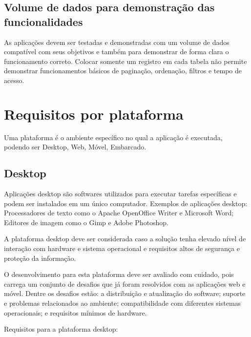


\subsection{Volume de dados para demonstração das funcionalidades}
As aplicações devem ser testadas e demonstradas com um volume de dados compatível com seus objetivos e também para demonstrar de forma clara o funcionamento correto. Colocar somente um registro em cada tabela não permite demonstrar funcionamentos básicos de paginação, ordenação, filtros e tempo de acesso.



\section{Requisitos por plataforma}
Uma plataforma é o ambiente específico no qual a aplicação é executada, podendo ser Desktop, Web, Móvel, Embarcado. 



\subsection{Desktop}
Aplicações desktop são softwares utilizados para executar tarefas específicas e podem ser instalados em um único computador. Exemplos de aplicações desktop: Processadores de texto como o Apache OpenOffice Writer e Microsoft Word; Editores de imagem como o Gimp e Adobe Photoshop.

A plataforma desktop deve ser considerada caso a solução tenha elevado nível de interação com hardware e sistema operacional e requisitos altos de segurança e proteção da informação. 

O desenvolvimento para esta plataforma deve ser avaliado com cuidado, pois carrega um conjunto de desafios que já foram resolvidos com as aplicações web e móvel. Dentre os desafios estão: a distribuição e atualização do software; suporte e problemas relacionados ao ambiente; compatibilidade com diferentes sistemas operacionais; e requisitos mínimos de hardware.

Requisitos para a plataforma desktop: 

